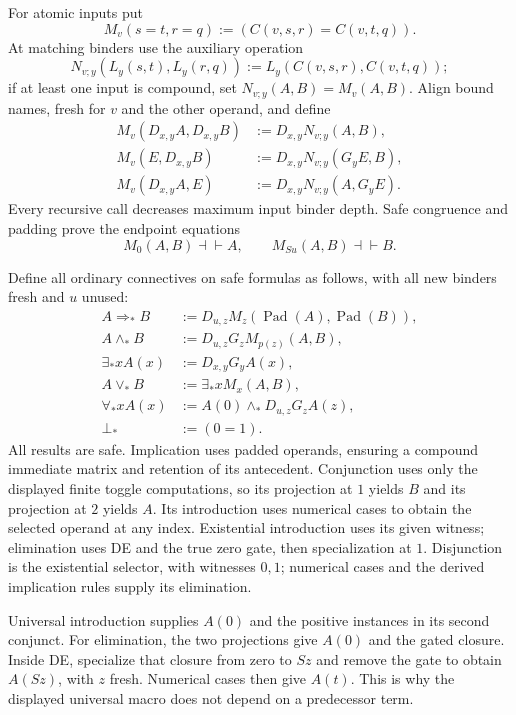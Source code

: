 For atomic inputs put
\[
 M_v(s=t,r=q):=(C(v,s,r)=C(v,t,q)).
\]
At matching binders use the auxiliary operation
\[
 N_{v;y}(L_y(s,t),L_y(r,q))
       :=L_y(C(v,s,r),C(v,t,q));
\]
if at least one input is compound, set $N_{v;y}(A,B)=M_v(A,B)$.
Align bound names, fresh for $v$ and the other operand, and define
\begin{align*}
 M_v(D_{x,y}A,D_{x,y}B)&:=D_{x,y}N_{v;y}(A,B),\\
 M_v(E,D_{x,y}B)&:=D_{x,y}N_{v;y}(G_yE,B),\\
 M_v(D_{x,y}A,E)&:=D_{x,y}N_{v;y}(A,G_yE).
\end{align*}
Every recursive call decreases maximum input binder depth. Safe
congruence and padding prove the endpoint equations
\[
 M_0(A,B)\dashv\vdash A,\qquad M_{Su}(A,B)\dashv\vdash B.
 \tag{AS-selector}
\]

Define all ordinary connectives on safe formulas as follows, with all
new binders fresh and $u$ unused:
\begin{align*}
 A\Rightarrow_*B
   &:=D_{u,z}M_z(\operatorname{Pad}(A),\operatorname{Pad}(B)),\\
 A\wedge_*B&:=D_{u,z}G_zM_{p(z)}(A,B),\\
 \exists_*x A(x)&:=D_{x,y}G_yA(x),\\
 A\vee_*B&:=\exists_*x M_x(A,B),\\
 \forall_*x A(x)&:=A(0)\wedge_*D_{u,z}G_zA(z),\\
 \bot_*&:=(0=1).
 \tag{AS-logic}
\end{align*}
All results are safe. Implication uses padded operands, ensuring a
compound immediate matrix and retention of its antecedent. Conjunction
uses only the displayed finite toggle computations, so its projection
at $1$ yields $B$ and its projection at $2$ yields $A$. Its introduction
uses numerical cases to obtain the selected operand at any index.
Existential introduction uses its given witness; elimination uses
DE and the true zero gate, then specialization at $1$. Disjunction
is the existential selector, with witnesses $0,1$; numerical cases
and the derived implication rules supply its elimination.

Universal introduction supplies $A(0)$ and the positive instances in
its second conjunct. For elimination, the two projections give $A(0)$
and the gated closure. Inside DE, specialize that closure from zero
to $Sz$ and remove the gate to obtain $A(Sz)$, with $z$ fresh. Numerical
cases then give $A(t)$. This is why the displayed universal macro
does not depend on a predecessor term.

